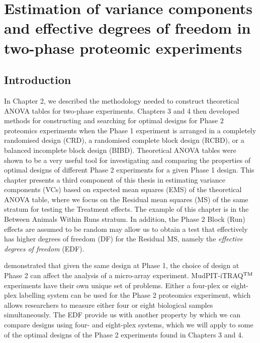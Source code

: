\chapter{Estimation of variance components and effective degrees of freedom in two-phase proteomic experiments}

\section{Introduction}
\label{sec:introChap5}
In Chapter 2, we described the methodology needed to construct theoretical ANOVA tables for two-phase experiments. Chapters 3 and 4 then developed methods for constructing and searching for optimal designs for Phase 2 proteomics experiments when the Phase 1 experiment is arranged in a completely randomised design (CRD), a randomised complete block design (RCBD), or a balanced incomplete block design (BIBD). Theoretical ANOVA tables were shown to be a very useful tool for investigating and comparing the properties of optimal designs of different Phase 2 experiments for a given Phase 1 design. This chapter presents a third component of this thesis in estimating variance components (VCs) based on expected mean squares (EMS) of the theoretical ANOVA table, where we focus on the Residual mean squares (MS) of the same stratum for testing the Treatment effects. The example of this chapter is in the Between Animals Within Runs stratum. In addition, the Phase 2 Block (Run) effects are assumed to be random may allow us to obtain a test that effectively has higher degrees of freedom (DF) for the Residual MS, namely the \emph{effective degrees of freedom} (EDF).  


\cite{Jarrett2008} demonstrated that given the same design at Phase 1, the choice of design at Phase 2 can affect the analysis of a micro-array experiment. MudPIT-iTRAQ$^{\rm TM}$ experiments have their own unique set of problems. Either a four-plex or eight-plex labelling system can be used for the Phase 2 proteomics experiment, which allows researchers to measure either four or eight biological samples simultaneously. The EDF provide us with another property by which we can compare designs using four- and eight-plex systems, which we will apply to some of the optimal designs of the Phase 2 experiments found in Chapters 3 and 4.

